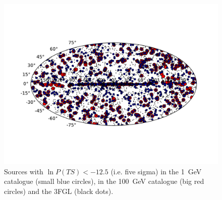 \documentclass[useAMS,usenatbib]{mn2e}
\begin{document}
\begin{figure}
  \includegraphics[width=\textwidth]{source_plot}
  \caption{Sources with $\ln P(TS)<-12.5$ (i.e. five sigma) in the 1~GeV catalogue (small blue circles), in the 100~GeV catalogue (big red circles) and the 3FGL (black dots).}
  \label{fig:sources}
\end{figure}
\end{document}
